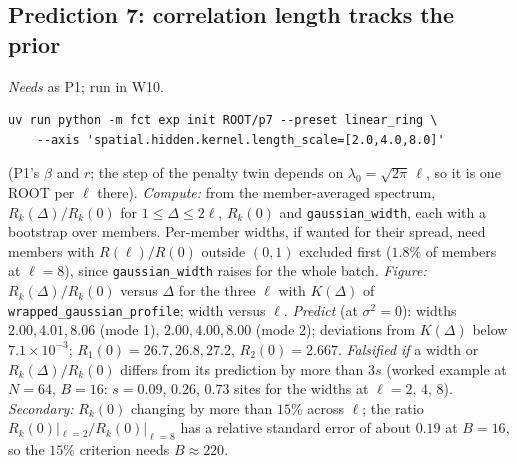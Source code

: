 \documentclass[11pt,a4paper]{article}
\newcommand{\code}[1]{\texttt{#1}}
\begin{document}
\subsection{Prediction 7: correlation length tracks the prior}
\label{sec:P7}
\emph{Needs} as P1; run in W10.
\begin{verbatim}
uv run python -m fct exp init ROOT/p7 --preset linear_ring \
    --axis 'spatial.hidden.kernel.length_scale=[2.0,4.0,8.0]'
\end{verbatim}
(P1's $\beta$ and $r$; the step of the penalty twin depends on $\lambda_0 = \sqrt{2\pi}\,\ell$, so it is one ROOT per $\ell$ there). \emph{Compute:} from the member-averaged spectrum, $R_k(\Delta)/R_k(0)$ for $1\le \Delta\le2\ell$, $R_k(0)$ and \code{gaussian\_width}, each with a bootstrap over members. Per-member widths, if wanted for their spread, need members with $R(\ell)/R(0)$ outside $(0, 1)$ excluded first ($1.8\%$ of members at $\ell = 8$), since \code{gaussian\_width} raises for the whole batch. \emph{Figure:} $R_k(\Delta)/R_k(0)$ versus $\Delta$ for the three $\ell$ with $K(\Delta)$ of \code{wrapped\_gaussian\_profile}; width versus $\ell$. \emph{Predict} (at $\sigma^2 = 0$): widths $2.00, 4.01, 8.06$ (mode 1), $2.00, 4.00, 8.00$ (mode 2); deviations from $K(\Delta)$ below $7.1\times10^{-3}$; $R_1(0) = 26.7, 26.8, 27.2$, $R_2(0) = 2.667$. \emph{Falsified if} a width or $R_k(\Delta)/R_k(0)$ differs from its prediction by more than $3s$ (worked example at $N = 64$, $B = 16$: $s = 0.09$, $0.26$, $0.73$ sites for the widths at $\ell = 2$, $4$, $8$). \emph{Secondary:} $R_k(0)$ changing by more than $15\%$ across $\ell$; the ratio $R_k(0)|_{\ell=2}/R_k(0)|_{\ell=8}$ has a relative standard error of about $0.19$ at $B = 16$, so the $15\%$ criterion needs $B\approx220$.
\end{document}
